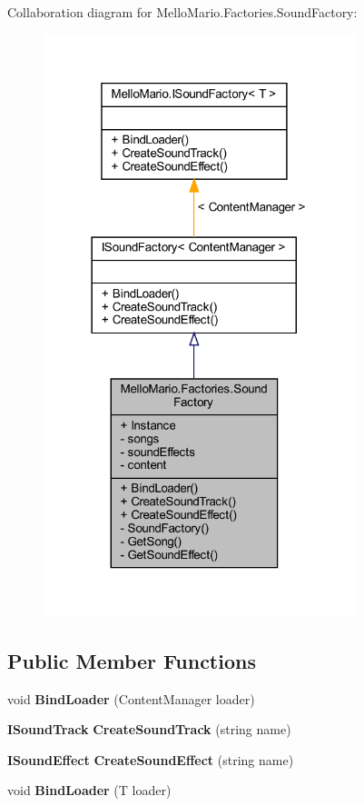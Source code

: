 Collaboration diagram for Mello\+Mario.\+Factories.\+Sound\+Factory\+:
\nopagebreak
\begin{figure}[H]
\begin{center}
\leavevmode
\includegraphics[width=258pt]{classMelloMario_1_1Factories_1_1SoundFactory__coll__graph}
\end{center}
\end{figure}
\subsection*{Public Member Functions}
\begin{DoxyCompactItemize}
\item 
void \textbf{ Bind\+Loader} (Content\+Manager loader)
\item 
\textbf{ I\+Sound\+Track} \textbf{ Create\+Sound\+Track} (string name)
\item 
\textbf{ I\+Sound\+Effect} \textbf{ Create\+Sound\+Effect} (string name)
\item 
void \textbf{ Bind\+Loader} (T loader)
\end{DoxyCompactItemize}
